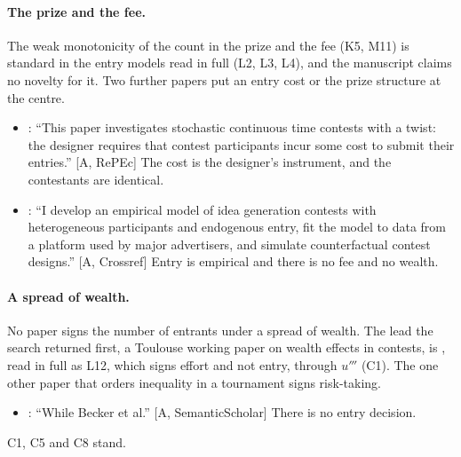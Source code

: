 \documentclass[11pt,a4paper]{article}
\newcommand{\aq}[2]{``#2''}
\begin{document}
\paragraph{The prize and the fee.} The weak monotonicity of the count in the
prize and the fee (K5, M11) is standard in the entry models read in full (L2,
L3, L4), and the manuscript claims no novelty for it. Two further papers put an
entry cost or the prize structure at the centre.
\begin{itemize}
\item \citet{Whitmeyer2023}: \aq{Whitmeyer2023}{This paper investigates stochastic continuous time contests with a twist: the designer requires that contest participants incur some cost to submit their entries.} [A, RePEc] The cost is the designer's
  instrument, and the contestants are identical.
\item \citet{Kireyev2020}: \aq{Kireyev2020}{I develop an empirical model of idea generation contests with heterogeneous participants and endogenous entry, fit the model to data from a platform used by major advertisers, and simulate counterfactual contest designs.} [A, Crossref] Entry is empirical and there is no
  fee and no wealth.
\end{itemize}

\paragraph{A spread of wealth.} No paper signs the number of entrants under a
spread of wealth. The lead the search returned first, a Toulouse working paper
on wealth effects in contests, is \citet{SchroyenTreich2016}, read in full as
L12, which signs effort and not entry, through $u'''$ (C1). The one other
paper that orders inequality in a tournament signs risk-taking.
\begin{itemize}
\item \citet{Hopkins2018}: \aq{Hopkins2018}{While Becker et al.} [A, SemanticScholar] There is no entry decision.
\end{itemize}
C1, C5 and C8 stand.
\end{document}
